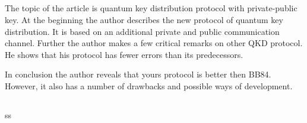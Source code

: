 \subsection{\review}

The topic of the article is quantum key distribution protocol with private-public key. At the beginning the author describes the new protocol of quantum key distribution. It is based on an additional private and public communication channel. Further the author makes a few critical remarks on other QKD protocol. He shows that his protocol has fewer errors than its predecessors.

In conclusion the author reveals that yours protocol is better then BB84. However, it also has a number of drawbacks and possible ways of development.
 


\subsection{\dic}
ss